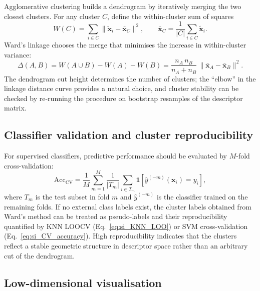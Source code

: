 \documentclass[journal=aamick,manuscript=article]{achemso}
\begin{document}
Agglomerative clustering builds a dendrogram by iteratively merging
the two closest clusters. For any cluster $C$, define the within-cluster
sum of squares
\begin{equation}
	W(C)
	=
	\sum_{i \in C}
	\|\tilde{\mathbf{x}}_i - \bar{\mathbf{x}}_C\|^2,
	\qquad
	\bar{\mathbf{x}}_C = \frac{1}{|C|}\sum_{i \in C} \tilde{\mathbf{x}}_i.
	\label{eq:si_Ward_within}
\end{equation}
Ward's linkage chooses the merge that minimises the increase in
within-cluster variance:
\begin{equation}
	\Delta(A,B)
	=
	W(A\cup B) - W(A) - W(B)
	=
	\frac{n_A\, n_B}{n_A + n_B}\,
	\|\bar{\mathbf{x}}_A - \bar{\mathbf{x}}_B\|^2.
	\label{eq:si_Ward}
\end{equation}
The dendrogram cut height determines the number of clusters; the
``elbow'' in the linkage distance curve provides a natural choice, and
cluster stability can be checked by re-running the procedure on
bootstrap resamples of the descriptor matrix.

\subsection{Classifier validation and cluster reproducibility}
\label{sec:si_cv}

For supervised classifiers, predictive performance should be evaluated by
$M$-fold cross-validation:
\begin{equation}
	\mathrm{Acc}_{\mathrm{CV}}
	=
	\frac{1}{M}
	\sum_{m=1}^{M}
	\frac{1}{|T_m|}
	\sum_{i \in T_m}
	\mathbf{1}\!\left[
	\hat{y}^{(-m)}(\mathbf{x}_i) = y_i
	\right],
	\label{eq:si_CV_accuracy}
\end{equation}
where $T_m$ is the test subset in fold $m$ and $\hat{y}^{(-m)}$ is the
classifier trained on the remaining folds. If no external class labels
exist, the cluster labels obtained from Ward's method can be treated as
pseudo-labels and their reproducibility quantified by KNN LOOCV
(Eq.~\eqref{eq:si_KNN_LOO}) or SVM cross-validation
(Eq.~\eqref{eq:si_CV_accuracy}). High reproducibility indicates that the
clusters reflect a stable geometric structure in descriptor space rather
than an arbitrary cut of the dendrogram.

\subsection{Low-dimensional visualisation}
\label{sec:si_PCA}
\end{document}
